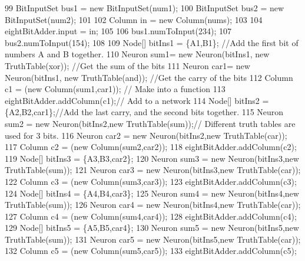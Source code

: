 \begin{DoxyCode}
99         BitInputSet bus1 = \textcolor{keyword}{new} BitInputSet(num1);
100         BitInputSet bus2 = \textcolor{keyword}{new} BitInputSet(num2);
101         
102         Column in = \textcolor{keyword}{new} Column(nums);
103         
104         eightBitAdder.input = in;
105         
106         bus1.numToInput(234);
107         bus2.numToInput(154);
108         
109         Node[] bitIns1 = \{A1,B1\};  \textcolor{comment}{//Add the first bit of numbers A and B together.}
110         Neuron sum1= \textcolor{keyword}{new} Neuron(bitIns1, \textcolor{keyword}{new} TruthTable(xor)); \textcolor{comment}{//Get the sum of the bits}
111         Neuron car1= \textcolor{keyword}{new} Neuron(bitIns1, \textcolor{keyword}{new} TruthTable(and)); \textcolor{comment}{//Get the carry of the bits}
112         Column c1 = (\textcolor{keyword}{new} Column(sum1,car1)); \textcolor{comment}{// Make into a function}
113         eightBitAdder.addColumn(c1);\textcolor{comment}{// Add to a network}
114         Node[] bitIns2 = \{A2,B2,car1\};\textcolor{comment}{//Add the last carry, and the second bits together.}
115         Neuron sum2 = \textcolor{keyword}{new} Neuron(bitIns2,\textcolor{keyword}{new} TruthTable(sum));\textcolor{comment}{// Different truth tables are used for 3
       bits.}
116         Neuron car2 = \textcolor{keyword}{new} Neuron(bitIns2,\textcolor{keyword}{new} TruthTable(car));
117         Column c2 = (\textcolor{keyword}{new} Column(sum2,car2));
118         eightBitAdder.addColumn(c2);
119         Node[] bitIns3 = \{A3,B3,car2\};
120         Neuron sum3 = \textcolor{keyword}{new} Neuron(bitIns3,\textcolor{keyword}{new} TruthTable(sum));
121         Neuron car3 = \textcolor{keyword}{new} Neuron(bitIns3,\textcolor{keyword}{new} TruthTable(car));
122         Column c3 = (\textcolor{keyword}{new} Column(sum3,car3));
123         eightBitAdder.addColumn(c3);
124         Node[] bitIns4 = \{A4,B4,car3\};
125         Neuron sum4 = \textcolor{keyword}{new} Neuron(bitIns4,\textcolor{keyword}{new} TruthTable(sum));
126         Neuron car4 = \textcolor{keyword}{new} Neuron(bitIns4,\textcolor{keyword}{new} TruthTable(car));
127         Column c4 = (\textcolor{keyword}{new} Column(sum4,car4));
128         eightBitAdder.addColumn(c4);
129         Node[] bitIns5 = \{A5,B5,car4\};
130         Neuron sum5 = \textcolor{keyword}{new} Neuron(bitIns5,\textcolor{keyword}{new} TruthTable(sum));
131         Neuron car5 = \textcolor{keyword}{new} Neuron(bitIns5,\textcolor{keyword}{new} TruthTable(car));
132         Column c5 = (\textcolor{keyword}{new} Column(sum5,car5));
133         eightBitAdder.addColumn(c5);

\end{DoxyCode}
